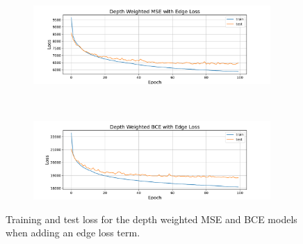\begin{figure}[htb]
    \centering
    \begin{subfigure}[b]{\textwidth}
        \centering
        \captionsetup{justification=centering}
        \includegraphics[width=0.99\textwidth]{figures/8_/3_final_MSE_depth_weighted10_with_depth_weighted_canny_edge_mae100_loss.pdf}
        \label{fig:3_final_MSE_depth_weighted10_with_depth_weighted_canny_edge_mae100_loss}
    \end{subfigure} \\
    \begin{subfigure}[b]{\textwidth}
        \centering
        \captionsetup{justification=centering}
        \includegraphics[width=0.99\textwidth]{figures/8_/6_final_BCE_depth_weighted10_with_depth_weighted_canny_edge_mae100_loss.pdf}
        \label{fig:6_final_BCE_depth_weighted10_with_depth_weighted_canny_edge_mae100_loss}
    \end{subfigure} 
    \caption{Training and test loss for the depth weighted MSE and BCE models when adding an edge loss term.}
    \label{fig:8_edge_depth_weighted_vae}
\end{figure}

